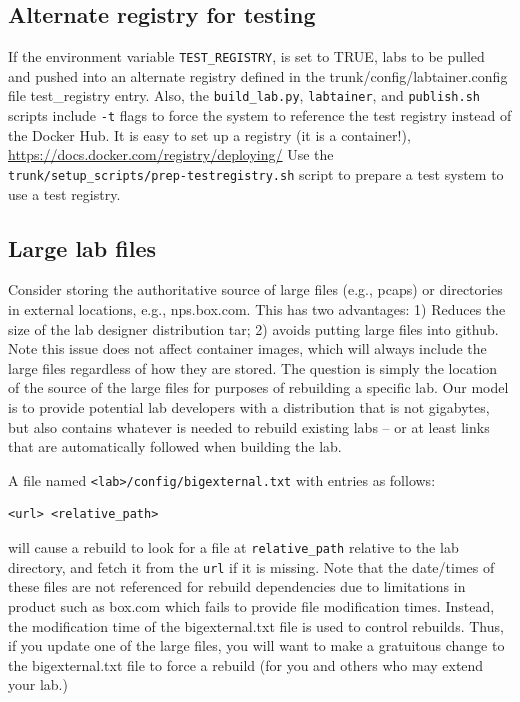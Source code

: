 \documentclass[12pt]{article}
\begin{document}
\subsection{Alternate registry for testing}
If the environment variable {\tt TEST\_REGISTRY}, is set to TRUE, labs to be pulled and pushed
into an alternate registry defined in the trunk/config/labtainer.config file test\_registry entry.
Also, the {\tt build\_lab.py}, {\tt labtainer}, and {\tt publish.sh} scripts include {\tt -t} flags to
force the system to reference the test registry instead of the Docker Hub.
It is easy to set up a registry (it is a container!), \url{https://docs.docker.com/registry/deploying/}
Use the {\tt trunk/setup\_scripts/prep-testregistry.sh} script to
prepare a test system to use a test registry.

\subsection{Large lab files}
Consider storing the authoritative source of large files (e.g., pcaps) or directories in external locations, e.g., nps.box.com.  This has two
advantages:  1) Reduces the size of the lab designer distribution tar; 2) avoids putting large files
into github.  Note this issue does not affect container images, which will always include the large files regardless of how they
are stored.  The question is simply the location of the source of the large files for purposes of
rebuilding a specific lab.   Our model is to provide potential lab developers with a distribution that is not gigabytes, but also contains
whatever is needed to rebuild existing labs -- or at least links that are automatically followed when building the lab.

A file named {\tt <lab>/config/bigexternal.txt} with entries as follows:
\begin{verbatim}
<url> <relative_path>
\end{verbatim}
\noindent will cause a rebuild to look for a file at {\tt relative\_path} relative to the lab directory, and
fetch it from the {\tt url} if it is missing.  Note that the date/times of these files are not referenced for rebuild dependencies
due to limitations in product such as box.com which fails to provide file modification times.  Instead, the modification time of the
bigexternal.txt file is used to control rebuilds.  Thus, if you update one of the large files, you will want to make a gratuitous change
to the bigexternal.txt file to force a rebuild (for you and others who may extend your lab.)
\end{document}
